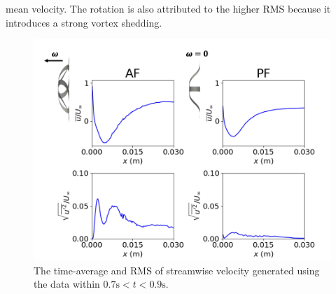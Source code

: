 \documentclass[preprint,12pt,sort&compress]{elsarticle}
\theoremstyle{definition}%
\begin{document}
mean velocity. The rotation is also attributed to the higher RMS because it introduces a strong vortex shedding.\\
\begin{figure}[!htbp]
    \centering
    \includegraphics[angle=0,width=1.0\textwidth]{fig/flier-centerline-umean_3.png}
    \caption{The time-average and RMS of streamwise velocity generated using the data within $0.7 \mathrm{s} < t < 0.9 \mathrm{s}$.}
    \label{fig:flier-umean}
\end{figure}
\end{document}
